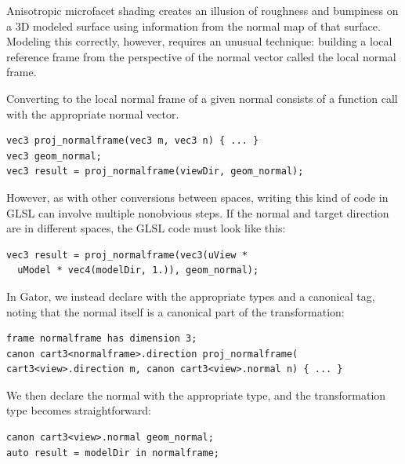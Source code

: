 {Anisotropic microfacet shading creates an illusion of roughness and bumpiness on a 3D modeled surface using information from the normal map of that surface.  Modeling this correctly, however, requires an unusual technique: building a local reference frame from the perspective of the normal vector called the local normal frame.

Converting to the local normal frame of a given normal consists of a function call with the appropriate normal vector.
%
\begin{lstlisting}
vec3 proj_normalframe(vec3 m, vec3 n) { ... }
vec3 geom_normal;
vec3 result = proj_normalframe(viewDir, geom_normal);
\end{lstlisting}
%
However, as with other conversions between spaces,
writing this kind of code in GLSL can
involve multiple nonobvious steps.
If the normal and target direction are in different spaces, the GLSL code must look like this:
%
\begin{lstlisting}
vec3 result = proj_normalframe(vec3(uView * 
  uModel * vec4(modelDir, 1.)), geom_normal);
\end{lstlisting}
%
In Gator, we instead declare  with the appropriate types and a canonical tag, noting that the normal itself is a canonical part of the transformation:
%
\begin{lstlisting}
frame normalframe has dimension 3;
canon cart3<normalframe>.direction proj_normalframe(
cart3<view>.direction m, canon cart3<view>.normal n) { ... }
\end{lstlisting}
%
We then declare the normal  with the appropriate type, and the transformation type becomes straightforward:
%
\begin{lstlisting}
canon cart3<view>.normal geom_normal;
auto result = modelDir in normalframe;
\end{lstlisting}
%
}
